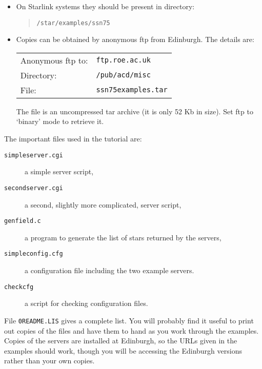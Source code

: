 \documentclass[twoside,11pt]{article}
\renewcommand{\_}{\texttt{\symbol{95}}}
\begin{document}
\begin{itemize}

  \item On Starlink systems they should be present in directory:

  \begin{quote}
   {\tt /star/examples/ssn75}
  \end{quote}

  \item Copies can be obtained by anonymous ftp from Edinburgh.  The
   details are:

  \begin{tabular}{ll}
   Anonymous ftp to: & {\tt ftp.roe.ac.uk}    \\
   Directory:        & {\tt /pub/acd/misc}    \\
   File:             & {\tt ssn75\_examples.tar} \\
  \end{tabular}

   The file is an uncompressed tar archive (it is only 52 Kb in size).
   Set ftp to `binary' mode to retrieve it.

\end{itemize}

The important files used in the tutorial are:

\begin{description}

  \item[{\tt simpleserver.cgi}] a simple server script,

  \item[{\tt secondserver.cgi}] a second, slightly more complicated, server
   script, 

  \item[{\tt genfield.c}] a program to generate the list of stars returned
   by the servers,

  \item[{\tt simpleconfig.cfg}] a configuration file including the two
   example servers.

  \item[{\tt checkcfg}] a script for checking configuration files.

\end{description}

File {\tt 0README.LIS} gives a complete list.  You will probably find it
useful to print out copies of the files and have them to hand as you work
through the examples.  Copies of the servers are installed at Edinburgh, so
the URLs given in the examples should work, though you will be accessing
the Edinburgh versions rather than your own copies.
\end{document}
